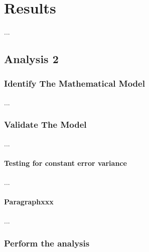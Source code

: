\documentclass[conference]{IEEEtran}
\begin{document}
\section{Results}\label{sec:results} %
...

\subsection{Analysis 2}


\subsubsection{Identify The Mathematical Model}
...

\subsubsection{Validate The Model}
...

\paragraph{Testing for constant error variance} ...


\paragraph{Paragraphxxx} ...


\subsubsection{Perform the analysis}

\end{document}
